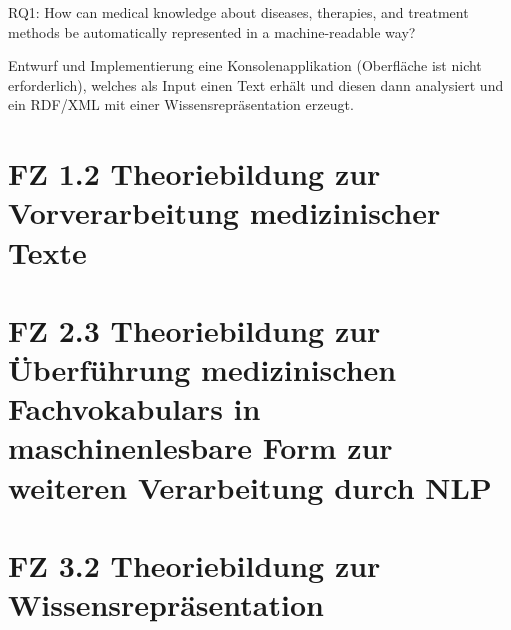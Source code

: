 RQ1: How can medical knowledge about diseases, therapies, and treatment methods be
automatically represented in a machine-readable way?

Entwurf und Implementierung eine Konsolenapplikation (Oberfläche ist nicht erforderlich),
welches als Input einen Text erhält und diesen dann analysiert und ein RDF/XML mit einer
Wissensrepräsentation erzeugt.


\section{FZ 1.2 Theoriebildung zur Vorverarbeitung medizinischer Texte}
\label{sec:FZ1.2} 

\section{FZ 2.3 Theoriebildung zur Überführung medizinischen Fachvokabulars in maschinenlesbare Form zur weiteren Verarbeitung durch NLP}
\label{sec:FZ2.3} 

\section{FZ 3.2 Theoriebildung zur Wissensrepräsentation}
\label{sec:FZ3.2} 
